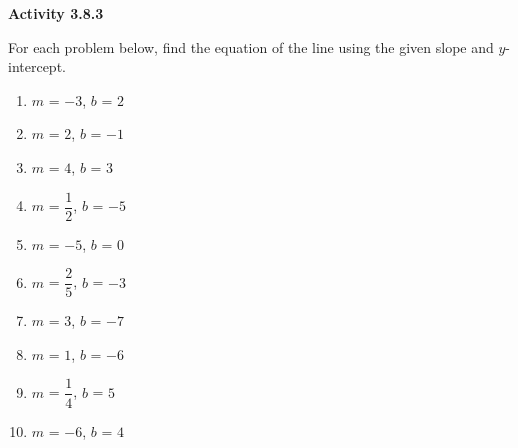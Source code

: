  \vspace{1ex}
\noindent\textbf{Activity 3.8.3}

\vspace{0.75ex}

For each problem below, find the equation of the line using the given slope and $y$-intercept.
\begin{multicols}{2}
\begin{enumerate}[noitemsep, label = \color{blue}\arabic*. ]
    \item $ m $ = $-3$, $b$ = $2$
    \item $ m $ = $2$, $b$ = $-1$
    \item $ m $ = $4$, $b$ = $3$
    \item $ m $ = $\dfrac{1}{2}$, $b$ = $-5$
    \item $ m $ = $-5$, $b$ = $0$
    \item $ m $ = $\dfrac{2}{5}$, $b$ = $-3$
    \item $ m $ = $3$, $b$ = $-7$
    \item $ m $ = $1$, $b$ = $-6$
    \item $ m $ = $\dfrac{1}{4}$, $b$ = $5$
    \item $ m $ = $-6$, $b$ = $4$
\end{enumerate}
\end{multicols}
